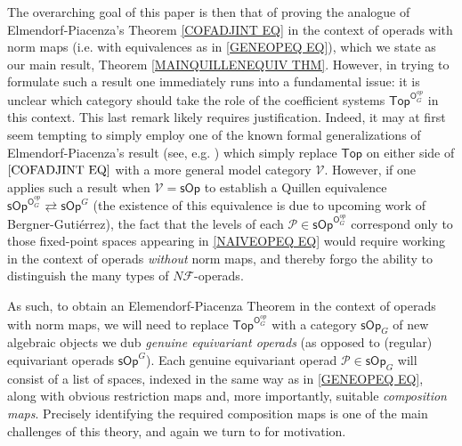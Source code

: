 \documentclass[a4paper,10pt
,draft
]{article}%
\numberwithin{equation}{section}
\numberwithin{figure}{section}
\theoremstyle{definition} %
\newcommand{\Op}{\mathsf{Op}}%
\newcommand{\V}{\ensuremath{\mathcal V}}
\newcommand{\1}{\ensuremath{\mathbbm 1}}%
\begin{document}
The overarching goal of this paper is then that of proving the analogue of Elmendorf-Piacenza's Theorem \eqref{COFADJINT EQ}
in the context of operads with norm maps (i.e. with equivalences as in \eqref{GENEOPEQ EQ}),
which we state as our main result, Theorem \ref{MAINQUILLENEQUIV THM}.
However, in trying to formulate such a result one immediately runs into a fundamental issue: 
it is unclear which category should take the role of the coefficient systems $\mathsf{Top}^{\mathsf{O}_G^{op}}$ in this context.
This last remark likely requires justification. 
Indeed, it may at first seem tempting to simply 
employ one of the known formal generalizations of Elmendorf-Piacenza's result (see, e.g. \cite[Thm. 3.17]{Ste16}) which simply replace
$\mathsf{Top}$ on either side of $\eqref{COFADJINT EQ}$
with a more general model category $\mathcal{V}$.
However, if one applies such a result when 
$\mathcal{V}=\mathsf{sOp}$
to establish a Quillen equivalence
$\mathsf{sOp}^{\mathsf{O}_G^{op}}
\rightleftarrows
\mathsf{sOp}^G$
(the existence of this equivalence is due to
upcoming work of Bergner-Guti\'{e}rrez), 
the fact that 
the levels of each 
$\mathcal{P} \in \mathsf{sOp}^{\mathsf{O}_G^{op}}$
correspond only to those fixed-point spaces appearing in \eqref{NAIVEOPEQ EQ}
would require working in the context of operads \textit{without} norm maps,
and thereby forgo the ability to distinguish 
the many types of $N \mathcal{F}$-operads.

As such, to obtain an Elemendorf-Piacenza Theorem
in the context of operads with norm maps, we will need to replace 
$\mathsf{Top}^{\mathsf{O}_G^{op}}$
with a category
$\mathsf{sOp}_G$
\index{categories!OpG@$\mathcal P \in \Op_G(\V)$}
of new algebraic objects we dub 
\textit{genuine equivariant operads}
(as opposed to (regular) equivariant operads
$\mathsf{sOp}^G$).
Each genuine equivariant operad 
$\mathcal{P} \in \mathsf{sOp}_G$
will consist of a list of spaces,
indexed in the same way as in 
\eqref{GENEOPEQ EQ},
along with obvious restriction maps and, more importantly, 
suitable \textit{composition maps}. Precisely identifying the required composition maps is one of the main challenges of this theory, and again we turn to \cite{BH15} for motivation.
\end{document}
